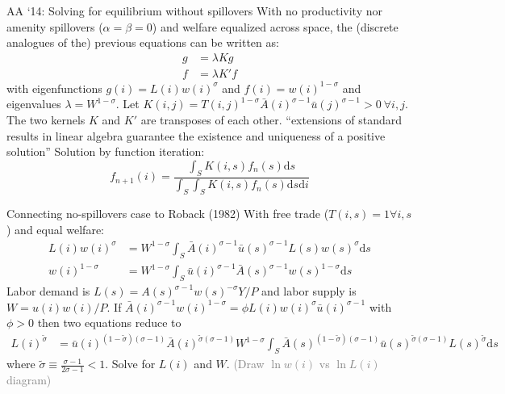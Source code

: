 \documentclass[11pt,notes=hide,aspectratio=169]{beamer}
\begin{document}
\begin{frame}{AA `14: Solving for equilibrium without spillovers}
With no productivity nor amenity spillovers ($\alpha=\beta=0$) and welfare equalized across space, the (discrete analogues of the) previous equations can be written as:
\begin{align*}
g &= \lambda K g \\
f &= \lambda K' f
\end{align*}
with eigenfunctions $g(i) = L(i) w(i)^{\sigma}$ and $f(i) = w(i)^{1-\sigma}$
and eigenvalues $\lambda=W^{1-\sigma}$.
Let $K(i,j) = T(i,j)^{1-\sigma} \bar{A}(i)^{\sigma-1} \bar{u}(j)^{\sigma-1}  > 0 \ \forall i,j$.
The two kernels $K$ and $K'$ are transposes of each other.
``extensions of standard results in linear algebra guarantee the existence and uniqueness of a positive solution''
Solution by function iteration: 
$$
f_{n+1}(i) = \frac{\int_{S}K(i,s)f_n(s)\textrm{d}s}{\int_{S}\int_{S}K(i,s)f_n(s)\textrm{d}s\textrm{d}i}
$$
\end{frame}
\begin{frame}{Connecting no-spillovers case to Roback (1982)}
With free trade ($T(i,s) = 1 \forall i,s$) and equal welfare:
\begin{align*}
L(i)w(i)^{\sigma}
&=
W^{1-\sigma} \int_{S} \bar{A}(i)^{\sigma-1}\bar{u}(s)^{\sigma-1}L(s)w(s)^{\sigma}\textrm{d}s 
\\
w(i)^{1-\sigma}
&=
W^{1-\sigma} \int_{S} \bar{u}(i)^{\sigma-1}\bar{A}(s)^{\sigma-1}w(s)^{1-\sigma}\textrm{d}s 
\end{align*}
Labor demand is $L(s) = A(s)^{\sigma-1} w(s)^{-\sigma} Y/P$
and labor supply is $W = u(i)w(i)/P$.
If $\bar{A}(i)^{\sigma-1}w(i)^{1-\sigma} = \phi L(i)w(i)^{\sigma}\bar{u}(i)^{\sigma-1}$ with $\phi>0$ then
two equations reduce to
\begin{align*}
L(i)^{\tilde{\sigma}} 
&=
\bar{u}(i)^{(1-\tilde{\sigma})(\sigma-1)} \bar{A}(i)^{\tilde{\sigma}(\sigma-1)} W^{1-\sigma}
\int_{S} \bar{A}(s)^{(1-\tilde{\sigma})(\sigma-1)} \bar{u}(s)^{\tilde{\sigma}(\sigma-1)} L(s)^{\tilde{\sigma}} \textrm{d} s
\end{align*}
where $\tilde{\sigma} \equiv \frac{\sigma-1}{2\sigma-1} <1$.
Solve for $L(i)$ and $W$.
\textcolor{gray}{(Draw $\ln w(i)$ vs $\ln L(i)$ diagram)}
\end{frame}
\end{document}
